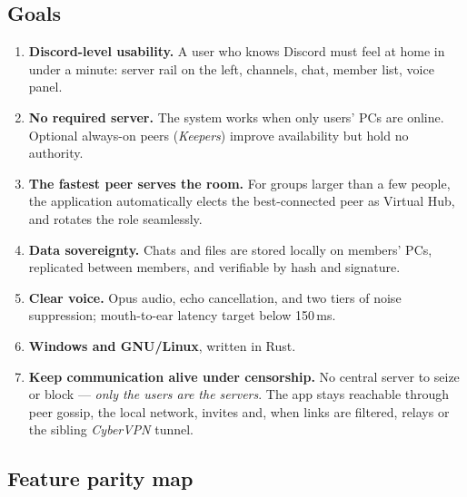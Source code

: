 \documentclass[11pt,a4paper]{article}
\begin{document}
\subsection{Goals}
\begin{enumerate}[label=\textbf{G\arabic*}]
  \item \textbf{Discord-level usability.} A user who knows Discord must feel at home in
        under a minute: server rail on the left, channels, chat, member list, voice panel.
  \item \textbf{No required server.} The system works when only users' PCs are online.
        Optional always-on peers (\emph{Keepers}) improve availability but hold no authority.
  \item \textbf{The fastest peer serves the room.} For groups larger than a few people,
        the application automatically elects the best-connected peer as Virtual Hub, and
        rotates the role seamlessly.
  \item \textbf{Data sovereignty.} Chats and files are stored locally on members' PCs,
        replicated between members, and verifiable by hash and signature.
  \item \textbf{Clear voice.} Opus audio, echo cancellation, and two tiers of noise
        suppression; mouth-to-ear latency target below 150\,ms.
  \item \textbf{Windows and GNU/Linux}, written in Rust.
  \item \textbf{Keep communication alive under censorship.} No central server to seize or
        block --- \emph{only the users are the servers}. The app stays reachable through
        peer gossip, the local network, invites and, when links are filtered, relays or the
        sibling \emph{CyberVPN} tunnel.
\end{enumerate}

\subsection{Feature parity map}
\end{document}
